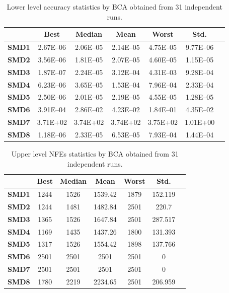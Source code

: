 \documentclass[conference]{IEEEtran}
\begin{document}
\begin{table}[!ht]
\renewcommand{\arraystretch}{1.3}
    \caption{Lower level accuracy statistics by BCA obtained from 31 independent runs.}
    \label{tab:ll-accuracy}
    \centering
    \begin{tabular}{|c|c|c|c|c|c|c|}
\hline
&\textbf{Best}&\textbf{Median}&\textbf{Mean}&\textbf{Worst}&\textbf{Std.}\\ \hline 
\textbf{SMD1} & 2.67E--06 & 2.06E--05 & 2.14E--05 & 4.75E--05 & 9.77E--06 \\ \hline 
\textbf{SMD2} & 3.56E--06 & 1.81E--05 & 2.07E--05 & 4.60E--05 & 1.15E--05 \\ \hline 
\textbf{SMD3} & 1.87E--07 & 2.24E--05 & 3.12E--04 & 4.31E--03 & 9.28E--04 \\ \hline 
\textbf{SMD4} & 6.23E--06 & 3.65E--05 & 1.53E--04 & 7.96E--04 & 2.33E--04 \\ \hline 
\textbf{SMD5} & 2.50E--06 & 2.01E--05 & 2.19E--05 & 4.55E--05 & 1.28E--05 \\ \hline 
\textbf{SMD6} & 3.91E--04 & 2.86E--02 & 4.23E--02 & 1.84E--01 & 4.35E--02 \\ \hline 
\textbf{SMD7} &  3.71E+02 &  3.74E+02 &  3.74E+02 &  3.75E+02 &  1.01E+00 \\ \hline 
\textbf{SMD8} & 1.18E--06 & 2.33E--05 & 6.53E--05 & 7.93E--04 & 1.44E--04 \\ \hline 

    \end{tabular}
\end{table}

\begin{table}[!ht]
\renewcommand{\arraystretch}{1.3}
    \caption{Upper level NFEs statistics by BCA obtained from 31 independent runs.}
    \label{tab:ul-fes}
    \centering
    \begin{tabular}{|c|c|c|c|c|c|c|}
\hline
&\textbf{Best}&\textbf{Median}&\textbf{Mean}&\textbf{Worst}&\textbf{Std.}\\ \hline 
\textbf{SMD1} & 1244 & 1526 & 1539.42 & 1879 & 152.119 \\ \hline
\textbf{SMD2} & 1244 & 1481 & 1482.84 & 2501 & 220.7   \\ \hline
\textbf{SMD3} & 1365 & 1526 & 1647.84 & 2501 & 287.517 \\ \hline
\textbf{SMD4} & 1169 & 1435 & 1437.26 & 1800 & 131.393 \\ \hline
\textbf{SMD5} & 1317 & 1526 & 1554.42 & 1898 & 137.766 \\ \hline
\textbf{SMD6} & 2501 & 2501 & 2501 &  2501 &   0   \\ \hline
\textbf{SMD7} & 2501 & 2501 & 2501 &  2501 &   0   \\ \hline
\textbf{SMD8} & 1780 & 2219 & 2234.65 & 2501 & 206.959 \\ \hline


    \end{tabular}
\end{table}
\end{document}
